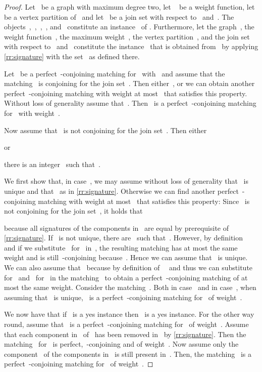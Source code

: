 \begin{proof}
  Let~ be a graph with maximum degree two, let ~ be a weight function, let~ be a vertex partition of~ and let~ be a join set with respect to~ and~. The objects~,~,~,~, and~ constitute an instance~ of \pCBMs{}. Furthermore, let the graph~, the weight function~, the maximum weight~, the vertex partition~, and the join set~ with respect to~ and~ constitute the instance~ that is obtained from~ by applying \autoref{rr:signature} with the set~ as defined there.

  Let~ be a perfect~-conjoining matching for~ with~ and assume that the matching~ is conjoining for the join set~. Then either~, or we can obtain another perfect~-conjoining matching with weight at most~ that satisfies this property. Without loss of generality assume that~. Then~ is a perfect~-conjoining matching for~ with weight~. 

Now assume that~ is not conjoining for the join set~. Then either
\begin{asparaenum}
\item  or \label{enu:sig11}
\item there is an integer~ such that~. \label{enu:sig12}
\end{asparaenum}
We first show that, in case~, we may assume without loss of generality that~ is unique and that~ as in \autoref{rr:signature}. Otherwise we can find another perfect~-conjoining matching with weight at most~ that satisfies this property: Since~ is not conjoining for the join set~, it holds that

because all signatures of the components in~ are equal by prerequisite of \autoref{rr:signature}. If~ is not unique, there are~ such that~. However, by definition~ and if we substitute~ for~ in~, the resulting matching has at most the same weight and is still~-conjoining because~. Hence we can assume that~ is unique. We can also assume that~ because by definition of~~ and thus we can substitute~ for~ and~ for~ in the matching~ to obtain a perfect~-conjoining matching of at most the same weight. Consider the matching~. Both in case~ and in case~, when assuming that~ is unique,~ is a perfect~-conjoining matching for~ of weight~.

  We now have that if~ is a yes instance then~ is a yes instance. For the other way round, assume that~ is a perfect~-conjoining matching for~ of weight~. Assume that each component in~ of~ has been removed in~ by \autoref{rr:signature}. Then the matching~ for~ is perfect,~-conjoining and of weight~. Now assume only the component~ of the components in~ is still present in~. Then, the matching~ is a perfect~-conjoining matching for~ of weight~.
\end{proof}
